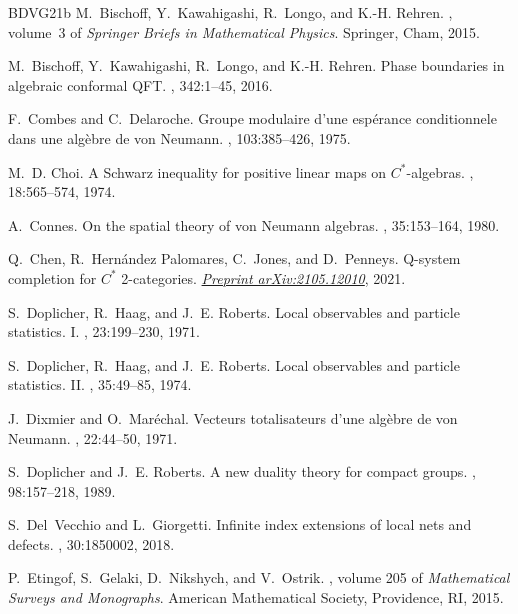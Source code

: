\documentclass[11pt,a4paper]{article}
\theoremstyle{plain}
\theoremstyle{definition}
\theoremstyle{remark}
\numberwithin{equation}{section}%
\begin{document}
\begin{thebibliography}{BDVG21b}
M.~Bischoff, Y.~Kawahigashi, R.~Longo, and K.-H. Rehren.
, volume~3 of {\em Springer Briefs
  in Mathematical Physics}.
\newblock Springer, Cham, 2015.

M.~Bischoff, Y.~Kawahigashi, R.~Longo, and K.-H. Rehren.
\newblock Phase boundaries in algebraic conformal {QFT}.
, 342:1--45, 2016.

F.~Combes and C.~Delaroche.
\newblock Groupe modulaire d'une esp{\'e}rance conditionnele dans une
  alg{\`e}bre de von {N}eumann.
, 103:385--426, 1975.

M.~D. Choi.
\newblock A {S}chwarz inequality for positive linear maps on
  {$C^{\ast}$}-algebras.
, 18:565--574, 1974.

A.~Connes.
\newblock On the spatial theory of von {N}eumann algebras.
, 35:153--164, 1980.

Q.~Chen, R.~Hern\'andez Palomares, C.~Jones, and D.~Penneys.
\newblock Q-system completion for {$C^*$} 2-categories.
\newblock \href{https://arxiv.org/abs/2105.12010}{\em Preprint arXiv:2105.12010}, 2021.

S.~Doplicher, R.~Haag, and J.~E. Roberts.
\newblock Local observables and particle statistics. {I}.
, 23:199--230, 1971.

S.~Doplicher, R.~Haag, and J.~E. Roberts.
\newblock Local observables and particle statistics. {II}.
, 35:49--85, 1974.

J.~Dixmier and O.~Mar\'{e}chal.
\newblock Vecteurs totalisateurs d'une alg{\`e}bre de von {N}eumann.
, 22:44--50, 1971.

S.~Doplicher and J.~E. Roberts.
\newblock A new duality theory for compact groups.
, 98:157--218, 1989.

S.~Del~Vecchio and L.~Giorgetti.
\newblock Infinite index extensions of local nets and defects.
, 30:1850002, 2018.

P.~Etingof, S.~Gelaki, D.~Nikshych, and V.~Ostrik.
, volume 205 of {\em Mathematical Surveys and
  Monographs}.
\newblock American Mathematical Society, Providence, RI, 2015.


\end{thebibliography}
\end{document}
